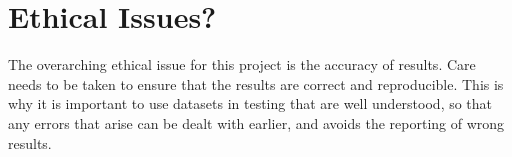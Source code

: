 \documentclass{article}
\begin{document}
\section{Ethical Issues?}

The overarching ethical issue for this project is the accuracy of results.
Care needs to be taken to ensure that the results are correct and reproducible.
This is why it is important to use datasets in testing that are well understood,
so that any errors that arise can be dealt with earlier, and avoids the
reporting of wrong results.
\end{document}
